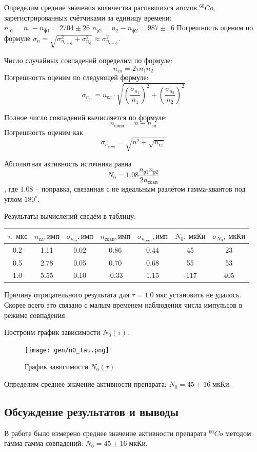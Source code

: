\documentclass[10pt,a4paper]{article}
\begin{document}
	Определим средние значения количества распавшихся атомов ${}^{60}Co$, зарегистрированных счётчиками за единицу времени:\\
	$n_{р1} = n_{1} - n_{ф1} = 2704 \pm 26$
	$n_{р2} = n_{2} - n_{ф2} = 987  \pm 16$
	Погрешность оценим по формуле $\sigma_{n} = \sqrt{\sigma_{n_{с+ф}}^2 + \sigma_{n_ф}^2} \approx \sigma_{n_{с+ф}}^2$.
	
	Число случайных совпадений определим по формуле:
	$$n_{сл} = 2 \tau n_{1} n_{2}$$
	Погрешность оценим по следующей формуле:
	$$\sigma_{n_{сл}} = n_{сл} \cdot \sqrt{ \left(\frac{\sigma_{n_1}}{n_1}\right)^2 + \left(\frac{\sigma_{n_2}}{n_2}\right)^2 }$$
	
	Полное число совпадений вычисляется по формуле:
	$$
	n_{совп} = n - n_{сл}
	$$
	Погрешность оценим как
	$$
	\sigma_{n_{совп}} = \sqrt{n^2 + \sqrt{n_{сл}}}
	$$
	
	Абсолютная активность источника равна
	$$
	N_0 = 1.08 \frac{n_{р1} n_{р2}}{2 n_{совп}}
	$$,
	где $1.08$ -- поправка, связанная с не идеальным разлётом гамма-квантов под углом $180^\circ$.
	
	Результаты вычислений сведём в таблицу:\\
	\begin{tabular}{ccccccc}
		\hline
		$\tau, \; мкс$ & $n_{сл}, имп$ & $\sigma_{n_{сл}}, имп$ & $n_{совп}, имп$ & $\sigma_{n_{совп}}, имп$ & $N_0, \; мкКи$ & $\sigma_{N_0}, \; мкКи$ \\
		\hline
		0.2 & 1.11 & 0.02 & 0.86 & 0.44 & 45 & 23 \\
		0.5 & 2.78 & 0.05 & 0.70 & 0.68 & 55 & 53 \\
		1.0 & 5.55 & 0.10 & -0.33 & 1.15 & -117 & 405 \\ 
		\hline
	\end{tabular}

	Причину отрицательного результата для $\tau = 1.0 \; мкс$ установить не удалось. Скорее всего это связано с малым временем наблюдения числа импульсов в режиме совпадения.

	Построим график зависимости $N_0(\tau)$.
	\begin{figure}
		\centering
		\texttt{[image: gen/n0\_tau.png]}
		\caption{График зависимости $N_0(\tau)$}
	\end{figure}

	Определим среднее значение активности препарата:
	$N_0 = 45 \pm 16 \; мкКи$.
	
	\subsection*{Обсуждение результатов и выводы}
	
	В работе было измерено среднее значение активности препарата ${}^{60} Co$ методом гамма-гамма совпадений:
	$N_0 = 45 \pm 16 \; мкКи$.
		
\end{document}
